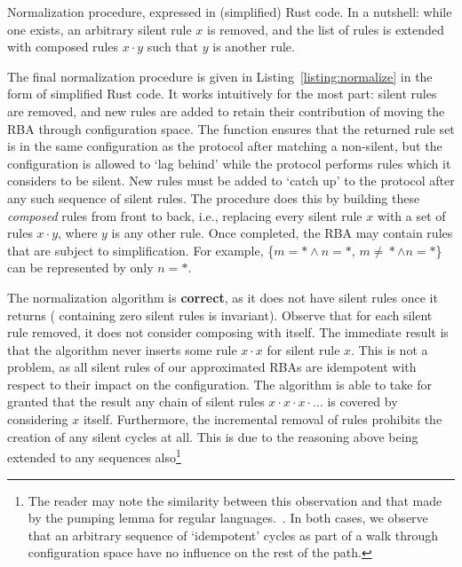\begin{listing}[ht]
	\inputminted[]{rust}{normalize.rs}
	\caption[Normalization procedure Rusty pseudocode.]{Normalization procedure, expressed in (simplified) Rust code. In a nutshell: while one exists, an arbitrary silent rule $x$ is removed, and the list of rules is extended with composed rules $x\cdot{}y$ such that $y$ is another rule.}
	\label{listing:normalize}
\end{listing}

The final normalization procedure is given in Listing~\ref{listing:normalize} in the form of simplified Rust code. It works intuitively for the most part: silent rules are removed, and new rules are added to retain their contribution of moving the RBA through configuration space. The function  ensures that the returned rule set is in the same configuration as the protocol after matching a non-silent, but the configuration is allowed to `lag behind' while the protocol performs rules which it considers to be silent. New rules must be added to `catch up' to the protocol after any such sequence of silent rules. The procedure does this by building these \textit{composed} rules from front to back, i.e., replacing every silent rule $x$ with a set of rules $x\cdot{}y$, where $y$ is any other rule. Once completed, the RBA may contain rules that are subject to simplification. For example, \{$m=*\wedge{}n=*$, $m\neq{}*\wedge{}n=*$\} can be represented by only $n=*$.

The normalization algorithm is \textbf{correct}, as it does not have silent rules once it returns ( containing zero silent rules is invariant). Observe that for each silent rule removed, it does not consider composing with itself. The immediate result is that the algorithm never inserts some rule $x\cdot{}x$ for silent rule $x$. This is not a problem, as all silent rules of our approximated RBAs are idempotent with respect to their impact on the configuration. The algorithm is able to take for granted that the result any chain of silent rules $x\cdot{}x\cdot{}x\cdot{}...$ is covered by considering $x$ itself. Furthermore, the incremental removal of rules prohibits the creation of any silent cycles at all. This is due to the reasoning above being extended to any sequences also\footnote{The reader may note the similarity between this observation and that made by the pumping lemma for regular languages.~\cite{linz2006introduction}. In both cases, we observe that an arbitrary sequence of `idempotent' cycles as part of a walk through configuration space have no influence on the rest of the path.}


